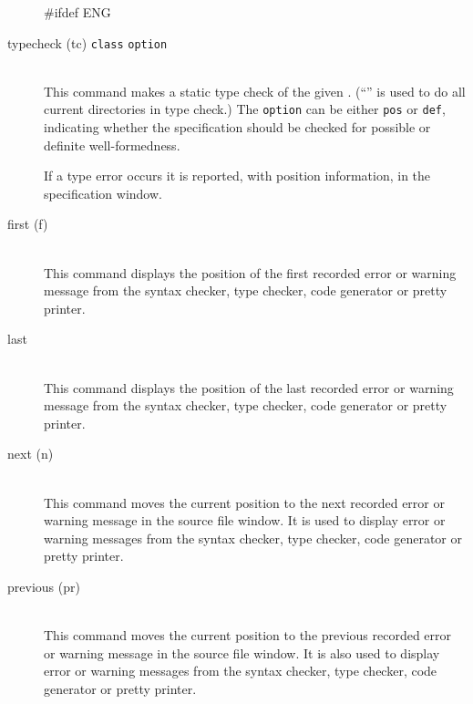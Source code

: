 \documentclass[\pformat,12pt]{article}
\begin{document}
\begin{description}  
#ifdef ENG
\item[typecheck (tc) \ifthenelse{\boolean{VDMsl}}{[{\tt module}]}
{{\tt class}} {\tt option}]\mbox{}\\ 
  This command makes a static type check of the given
  .
  (``{\tt *}'' is used to do  all current directories in type check.)
  The {\tt option} can be either {\tt pos} or {\tt def}, indicating whether the
  specification should be checked for possible or definite
  well-formedness.

  If a type error occurs it is reported, with position
  information, in the specification window.

\item[first (f)] \mbox{}\\
  This command displays the position of the first recorded error or
  warning message from the syntax checker, type checker, code
  generator or pretty printer.

\item[last] \mbox{}\\
  This command displays the position of the last recorded error or
  warning message from the syntax checker, type checker, code
  generator or pretty printer.

\item[next (n) \index{next command}]\mbox{}\\
  This command moves the current position to the next recorded error
  or warning message in the source file window.  It is used to
  display error or warning messages from the syntax checker, type
  checker, code generator or pretty printer.

\item[previous (pr)] \mbox{}\\
  This command moves the current position to the previous recorded
  error or warning message in the source file window. It is also used to
  display error or warning messages from the syntax checker, type
  checker, code generator or pretty printer.


\end{description}
\end{document}
